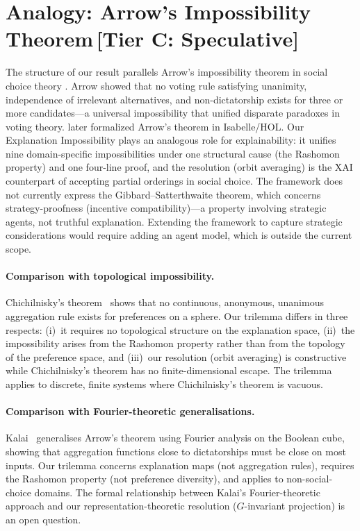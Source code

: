 \documentclass[11pt,a4paper]{article}
\begin{document}
\section{Analogy: Arrow's Impossibility Theorem\,\textnormal{\normalsize[Tier C: Speculative]}}
\label{sec:arrow-analogy}

The structure of our result parallels Arrow's impossibility theorem in social
choice theory \citep{arrow1951social}.  Arrow showed that no voting rule
satisfying unanimity, independence of irrelevant alternatives, and
non-dictatorship exists for three or more candidates---a universal
impossibility that unified disparate paradoxes in voting theory.
\citet{nipkow2009social} later formalized Arrow's theorem in Isabelle/HOL.
Our Explanation Impossibility plays an analogous role for
explainability: it unifies nine domain-specific impossibilities under one
structural cause (the Rashomon property) and one four-line proof, and the
resolution (orbit averaging) is the XAI counterpart of accepting partial
orderings in social choice.
The framework does not currently express the Gibbard--Satterthwaite theorem, which concerns strategy-proofness (incentive compatibility)---a property involving strategic agents, not truthful explanation.  Extending the framework to capture strategic considerations would require adding an agent model, which is outside the current scope.

\paragraph{Comparison with topological impossibility.}
Chichilnisky's theorem~\cite{chichilnisky1980social} shows that no continuous, anonymous, unanimous aggregation rule exists for preferences on a sphere. Our trilemma differs in three respects: (i)~it requires no topological structure on the explanation space, (ii)~the impossibility arises from the Rashomon property rather than from the topology of the preference space, and (iii)~our resolution (orbit averaging) is constructive while Chichilnisky's theorem has no finite-dimensional escape. The trilemma applies to discrete, finite systems where Chichilnisky's theorem is vacuous.

\paragraph{Comparison with Fourier-theoretic generalisations.}
Kalai~\cite{kalai2002fourier} generalises Arrow's theorem using Fourier analysis on the Boolean cube, showing that aggregation functions close to dictatorships must be close on most inputs. Our trilemma concerns explanation maps (not aggregation rules), requires the Rashomon property (not preference diversity), and applies to non-social-choice domains. The formal relationship between Kalai's Fourier-theoretic approach and our representation-theoretic resolution ($G$-invariant projection) is an open question.
\end{document}
